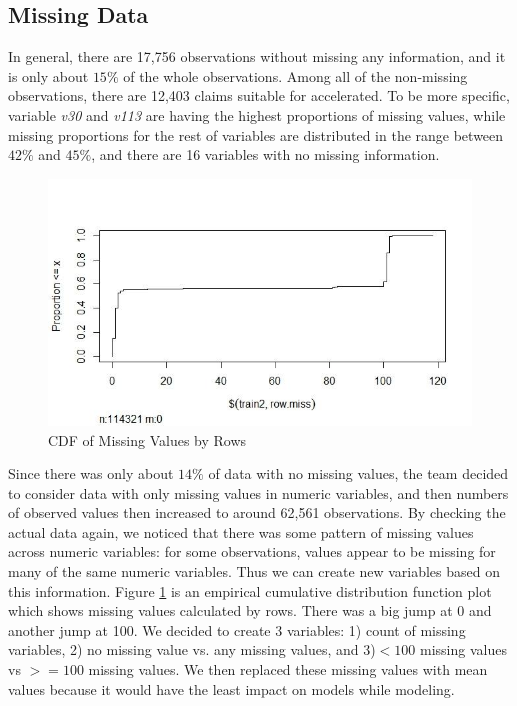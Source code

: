 \documentclass[paper=a4, fontsize=11pt]{scrartcl} %
\numberwithin{equation}{section} %
\numberwithin{figure}{section} %
\numberwithin{table}{section} %
\begin{document}
\subsection{Missing Data}
In general, there are 17,756 observations without missing any information, and it is only about $15\%$ of the whole observations. Among all of the non-missing observations, there are 12,403 claims suitable for accelerated. To be more specific, variable \emph{v30} and \emph{v113} are having the highest proportions of missing values, while missing proportions for the rest of variables are distributed in the range between $42\%$ and $45\%$, and there are 16 variables with no missing information.
\begin{figure} [!ht]\label{f1}
\includegraphics[width=1.0\textwidth]{RowmissEcdf}
\caption{CDF of Missing Values by Rows}

 
\end{figure}
Since there was only about $14\%$ of data with no missing values, the team decided to consider data with only missing values in numeric variables, and then numbers of observed values then increased to around 62,561 observations. By checking the actual data again, we noticed that there was some pattern of missing values across numeric variables: for some observations, values appear to be missing for many of the same numeric variables. Thus we can create new variables based on this information. Figure \ref{f1} is an empirical cumulative distribution function plot which shows missing values calculated by rows. There was a big jump at 0 and another jump at 100. We decided to create 3 variables: 1) count of missing variables, 2) no missing value vs. any missing values, and 3)$<100$ missing values vs $>= 100$ missing values. We then replaced these missing values with mean values because it would have the least impact on models while modeling.
\end{document}
